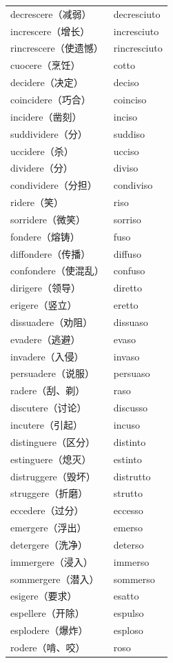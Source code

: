 \documentclass[UTF8,a4paper,titlepage,10pt]{report}
\begin{document}
\begin{enumerate}
\begin{itemize}
\begin{center}
\begin{tabular}{ll}
decrescere（减弱） & decresciuto\\
increscere（增长） & incresciuto\\
rincrescere（使遗憾） & rincresciuto\\
cuocere（烹饪） & cotto\\
decidere（决定） & deciso\\
coincidere（巧合） & coinciso\\
incidere（凿刻） & inciso\\
suddividere（分） & suddiso\\
uccidere（杀） & ucciso\\
dividere（分） & diviso\\
condividere（分担） & condiviso\\
ridere（笑） & riso\\
sorridere（微笑） & sorriso\\
fondere（熔铸） & fuso\\
diffondere（传播） & diffuso\\
confondere（使混乱） & confuso\\
dirigere（领导） & diretto\\
erigere（竖立） & eretto\\
dissuadere（劝阻） & dissuaso\\
evadere（逃避） & evaso\\
invadere（入侵） & invaso\\
persuadere（说服） & persuaso\\
radere（刮、剃） & raso\\
discutere（讨论） & discusso\\
incutere（引起） & incuso\\
distinguere（区分） & distinto\\
estinguere（熄灭） & estinto\\
distruggere（毁坏） & distrutto\\
struggere（折磨） & strutto\\
eccedere（过分） & eccesso\\
emergere（浮出） & emerso\\
detergere（洗净） & deterso\\
immergere（浸入） & immerso\\
sommergere（潜入） & sommerso\\
esigere（要求） & esatto\\
espellere（开除） & espulso\\
esplodere（爆炸） & esploso\\
rodere（啃、咬） & roso\\

\end{tabular}
\end{center}
\end{itemize}
\end{enumerate}
\end{document}
